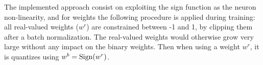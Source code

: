 


The implemented approach consist on exploiting the sign function as the neuron non-linearity, and for weights the following procedure is applied during training:
all real-valued weights ($w^r$) are constrained between -1 and 1, by clipping them after a batch normalization.
The real-valued weights would otherwise grow very large without any impact on the binary weights.
Then when using a weight $w^r$, it is quantizes using $w^b = {\rm Sign}(w^r)$.



